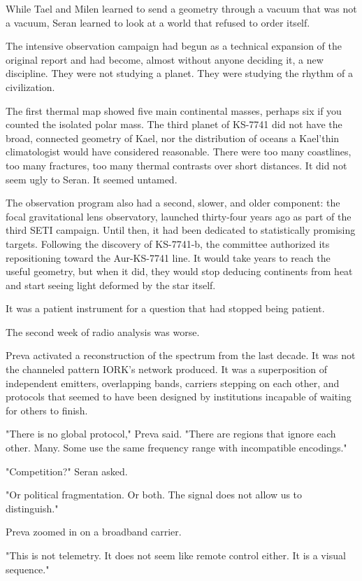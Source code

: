 \documentclass[11pt,a5paper,twoside]{book}
\begin{document}
While Tael and Milen learned to send a geometry through a vacuum that was not a vacuum, Seran learned to look at a world that refused to order itself.

The intensive observation campaign had begun as a technical expansion of the original report and had become, almost without anyone deciding it, a new discipline. They were not studying a planet. They were studying the rhythm of a civilization.

The first thermal map showed five main continental masses, perhaps six if you counted the isolated polar mass. The third planet of KS-7741 did not have the broad, connected geometry of Kael, nor the distribution of oceans a Kael'thin climatologist would have considered reasonable. There were too many coastlines, too many fractures, too many thermal contrasts over short distances. It did not seem ugly to Seran. It seemed untamed.

The observation program also had a second, slower, and older component: the focal gravitational lens observatory, launched thirty-four years ago as part of the third SETI campaign. Until then, it had been dedicated to statistically promising targets. Following the discovery of KS-7741-b, the committee authorized its repositioning toward the Aur-KS-7741 line. It would take years to reach the useful geometry, but when it did, they would stop deducing continents from heat and start seeing light deformed by the star itself.

It was a patient instrument for a question that had stopped being patient.

The second week of radio analysis was worse.

Preva activated a reconstruction of the spectrum from the last decade. It was not the channeled pattern IORK's network produced. It was a superposition of independent emitters, overlapping bands, carriers stepping on each other, and protocols that seemed to have been designed by institutions incapable of waiting for others to finish.

"There is no global protocol," Preva said. "There are regions that ignore each other. Many. Some use the same frequency range with incompatible encodings."

"Competition?" Seran asked.

"Or political fragmentation. Or both. The signal does not allow us to distinguish."

Preva zoomed in on a broadband carrier.

"This is not telemetry. It does not seem like remote control either. It is a visual sequence."
\end{document}
